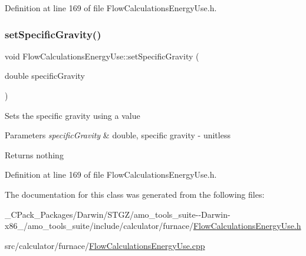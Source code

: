 Definition at line 169 of file Flow\+Calculations\+Energy\+Use.\+h.

\mbox{\label{class_flow_calculations_energy_use_abafa34d337124a1487fb0c871ea8a24a}} 
\subsubsection{\texorpdfstring{set\+Specific\+Gravity()}{setSpecificGravity()}\hspace{0.1cm}{\footnotesize\ttfamily [3/3]}}
{\footnotesize\ttfamily void Flow\+Calculations\+Energy\+Use\+::set\+Specific\+Gravity (\begin{DoxyParamCaption}\item[{double}]{specific\+Gravity }\end{DoxyParamCaption})\hspace{0.3cm}{\ttfamily [inline]}}

Sets the specific gravity using a value


\begin{DoxyParams}{Parameters}
{\em specific\+Gravity} & double, specific gravity -\/ unitless\\
\hline
\end{DoxyParams}
\begin{DoxyReturn}{Returns}
nothing 
\end{DoxyReturn}


Definition at line 169 of file Flow\+Calculations\+Energy\+Use.\+h.



The documentation for this class was generated from the following files\+:\begin{DoxyCompactItemize}
\item 
\+\_\+\+C\+Pack\+\_\+\+Packages/\+Darwin/\+S\+T\+G\+Z/amo\+\_\+tools\+\_\+suite-\/-\/\+Darwin-\/x86\+\_/amo\+\_\+tools\+\_\+suite/include/calculator/furnace/\hyperlink{___c_pack___packages_2_darwin_2_s_t_g_z_2amo__tools__suite--_darwin-x86__64_2amo__tools__suite_2aa662891a85863ab2a5643413f77ebfb}{Flow\+Calculations\+Energy\+Use.\+h}\item 
src/calculator/furnace/\hyperlink{_flow_calculations_energy_use_8cpp}{Flow\+Calculations\+Energy\+Use.\+cpp}\end{DoxyCompactItemize}
